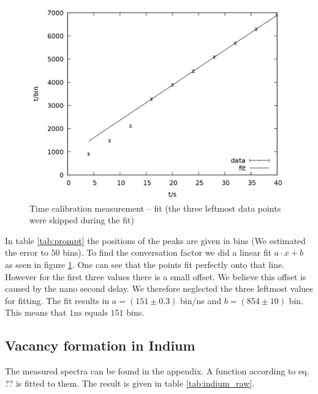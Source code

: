 \begin{figure}
\centering
\includegraphics[width=0.7\linewidth]{data/prompt/prompt_fit.png}
\caption{Time calibration measurement -- fit (the three leftmost data points were skipped during the fit)}
\label{fig:prompt_fit}
\end{figure}

In table \ref{tab:prompt} the positions of the peaks are given in bins (We estimated the error to $50$ bins). To find the conversation factor we did a linear fit $a\cdot x + b$ as seen in figure \ref{fig:prompt_fit}. One can see that the points fit perfectly onto that line. However for the first three values there is a small offset. We believe this offset is caused by the nano second delay. We therefore neglected the three leftmost values for fitting. The fit results in $a = (151 \pm 0.3)$ bin/ns and $b = (854 \pm 10)$ bin. This means that $\si{1 \nano\second}$ equals $151$ bins.

\subsection{Vacancy formation in Indium}

The measured spectra can be found in the appendix. A function according to eq. ?? is fitted to them. The result is given in table \ref{tab:indium_raw}. 

